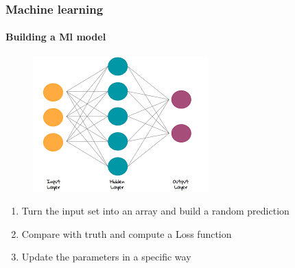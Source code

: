 \documentclass[aspectratio=43]{beamer}
\begin{document}
\begin{frame}

	\frametitle{Machine learning}
	\framesubtitle{Building a Ml model}
	
		\begin{figure}
			\includegraphics[width = 0.45\linewidth]{NN.png}
		\end{figure}
		
	\begin{enumerate}
		\item Turn the input set into an array and build a {\color{red}random} prediction 
		\item Compare with truth and compute a {\color{blue}Loss} function
		\item Update the parameters in a specific way
	\end{enumerate}
	

\end{frame}
\end{document}
